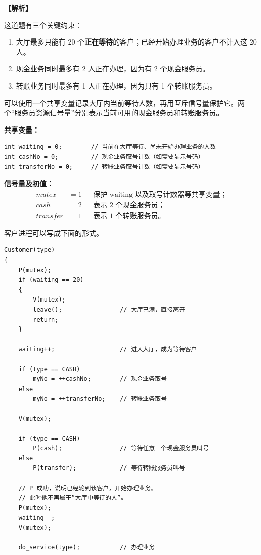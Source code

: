 \documentclass[UTF8,12pt]{ctexart}
\newenvironment{explanation}{\par\noindent\textbf{【解析】}\par\smallskip}{\par\medskip}
\begin{document}
\begin{explanation}
这道题有三个关键约束：
\begin{enumerate}
  \item 大厅最多只能有 20 个\textbf{正在等待}的客户；已经开始办理业务的客户不计入这 20 人。
  \item 现金业务同时最多有 2 人正在办理，因为有 2 个现金服务员。
  \item 转账业务同时最多有 1 人正在办理，因为只有 1 个转账服务员。
\end{enumerate}

可以使用一个共享变量记录大厅内当前等待人数，再用互斥信号量保护它。两个“服务员资源信号量”分别表示当前可用的现金服务员和转账服务员。

\textbf{共享变量：}
\begin{lstlisting}
int waiting = 0;        // 当前在大厅等待、尚未开始办理业务的人数
int cashNo = 0;         // 现金业务取号计数（如需要显示号码）
int transferNo = 0;     // 转账业务取号计数（如需要显示号码）
\end{lstlisting}

\textbf{信号量及初值：}
\begin{align*}
mutex &= 1 &&\text{保护 waiting 以及取号计数器等共享变量；}\\
cash &= 2 &&\text{表示 2 个现金服务员；}\\
transfer &= 1 &&\text{表示 1 个转账服务员。}
\end{align*}

客户进程可以写成下面的形式。

\begin{lstlisting}
Customer(type)
{
    P(mutex);
    if (waiting == 20)
    {
        V(mutex);
        leave();                // 大厅已满，直接离开
        return;
    }

    waiting++;                  // 进入大厅，成为等待客户

    if (type == CASH)
        myNo = ++cashNo;        // 现金业务取号
    else
        myNo = ++transferNo;    // 转账业务取号

    V(mutex);

    if (type == CASH)
        P(cash);                // 等待任意一个现金服务员叫号
    else
        P(transfer);            // 等待转账服务员叫号

    // P 成功，说明已经轮到该客户，开始办理业务。
    // 此时他不再属于“大厅中等待的人”。
    P(mutex);
    waiting--;
    V(mutex);

    do_service(type);           // 办理业务


\end{lstlisting}
\end{explanation}
\end{document}
